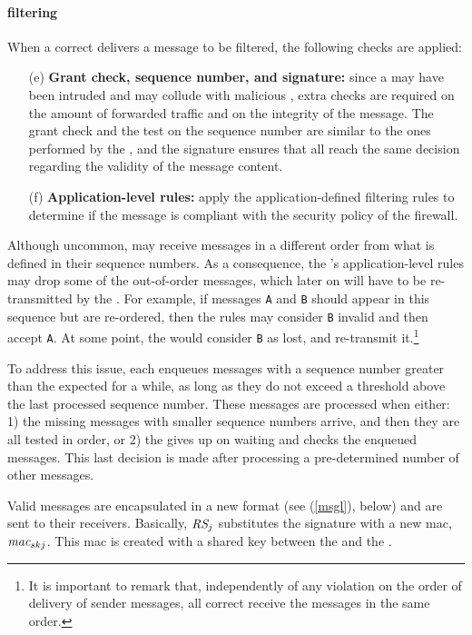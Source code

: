 \paragraph{\Repsieve filtering}
When a correct \repsieve delivers a message to be filtered, the following checks are applied:

\begin{enumerate}
\item[(e)] \textbf{Grant check, sequence number, and signature:} since a \presieve may have been intruded and may collude with malicious \sender, extra checks are required on the amount of forwarded traffic and on the integrity of the message.
The grant check and the test on the sequence number are similar to the ones performed by the \presieve, and the signature ensures that all \repsieves reach the same decision regarding the validity of the message content.
\item[(f)] \textbf{Application-level rules:} apply the application-defined filtering rules to determine if the message is compliant with the security policy of the firewall.
\end{enumerate}

Although uncommon, \repsieves may receive messages in a different order from what is defined in their sequence numbers.
As a consequence, the \repsieve's application-level rules may drop some of the out-of-order messages, which later on will have to be re-transmitted by the \sender.
For example, if messages \texttt{A} and \texttt{B} should appear in this sequence but are re-ordered, then the rules may consider \texttt{B} invalid and then accept \texttt{A}.
At some point, the \sender would consider \texttt{B} as lost, and re-transmit it.\footnote{It is important to remark that, independently of any violation on the order of delivery of sender messages, all correct \repsieves receive the messages in the same order.}

To address this issue, each \repsieve enqueues messages with a sequence number greater than the expected for a while, as long as they do not exceed a threshold above the last processed sequence number. These messages are processed when either: 1) the missing messages with smaller sequence numbers arrive, and then they are all tested in order, or 2) the \repsieve gives up on waiting and checks the enqueued messages. This last decision is made after processing a pre-determined number of other messages.

Valid messages are encapsulated in a new format (see (\ref{msgl}), below) and are sent to their receivers.
Basically, \repsieve $\emph{RS}_j$ substitutes the signature with a new \gls{mac}, $\emph{mac}_{skj}$.
This \gls{mac} is created with a shared key between the \repsieve and the \postsieve.


